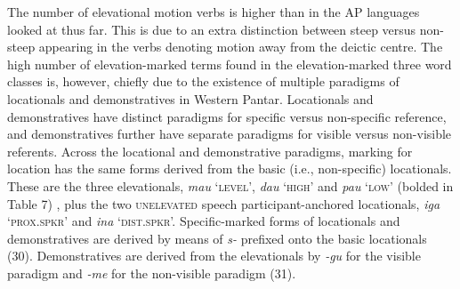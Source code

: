 The number of elevational motion verbs is higher than in the AP languages looked at thus far. This is due to an extra distinction between steep versus non-steep appearing in the verbs denoting motion away from the deictic centre. The high number of elevation-marked terms found in the elevation-marked three word classes is, however, chiefly due to the existence of multiple paradigms of locationals and demonstratives in Western Pantar. Locationals and demonstratives have distinct paradigms for specific versus non-specific reference, and demonstratives further have separate paradigms for visible versus non-visible referents. Across the locational and demonstrative paradigms, marking for location has the same forms derived from the basic (i.e., non-specific) locationals. These are the three elevationals, \textit{mau} {\textquoteleft}\textsc{level{\textquoteright},} \textit{dau }{\textquoteleft}\textsc{high{\textquoteright}} and \textit{pau }{\textquoteleft}\textsc{low{\textquoteright} }(bolded in Table 7)\textsc{
, }plus the two \textsc{unelevated} speech participant-anchored locationals, \textit{iga }{\textquoteleft}\textsc{prox.spkr{\textquoteright}} and \textit{ina} {\textquoteleft}\textsc{dist.spkr{\textquoteright}.} Specific-marked forms of locationals and demonstratives are derived by means of \textit{s-} prefixed onto the basic locationals (30). Demonstratives are derived from the elevationals by \textit{{}-gu} for the visible paradigm and \textit{{}-me} for the non-visible paradigm (31).

